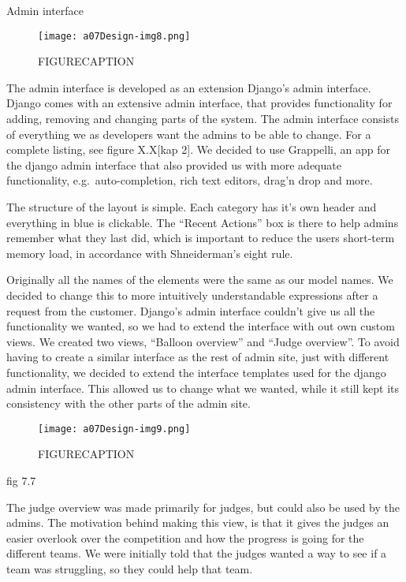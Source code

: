 Admin interface
 \begin{figure}[h!]
	\texttt{[image: a07Design-img8.png]} 
	\caption{FIGURECAPTION}
\end{figure}

The admin interface is developed as an extension
Django's admin interface. Django comes with an
extensive admin interface, that provides functionality for adding,
removing and changing parts of the system. The admin interface consists
of everything we as developers want the admins to be able to change.
For a complete listing, see figure X.X[kap 2]. We decided to use
Grappelli, an app for the django admin interface that also provided us
with more adequate functionality, e.g.\ auto-completion, rich text
editors, drag'n drop and more.

The structure of the layout is simple. Each category has
it's own header and everything in blue is clickable.
The ``Recent Actions'' box is there
to help admins remember what they last did, which is important to
reduce the users short-term memory load, in accordance with
Shneiderman's eight rule.

Originally all the names of the elements were the same as our model
names. We decided to change this to more intuitively understandable
expressions after a request from the customer. Django's
admin interface couldn't give us all the functionality
we wanted, so we had to extend the interface with out own custom views.
We created two views, ``Balloon overview'' and ``Judge overview''. 
To avoid having to create a similar interface as the rest of admin site,
just with different functionality, we decided to extend the interface 
templates used for the django admin interface. This allowed us to change 
what we wanted, while it still kept its consistency with the other parts 
of the admin site.



 \begin{figure}[h!]
	\texttt{[image: a07Design-img9.png]} 
	\caption{FIGURECAPTION}
\end{figure}
fig 7.7

The judge overview was made primarily for judges, but could also be used
by the admins. The motivation behind making this view, is that it gives
the judges an easier overlook over the competition and how the progress
is going for the different teams. We were initially told that the
judges wanted a way to see if a team was struggling, so they could help
that team.

